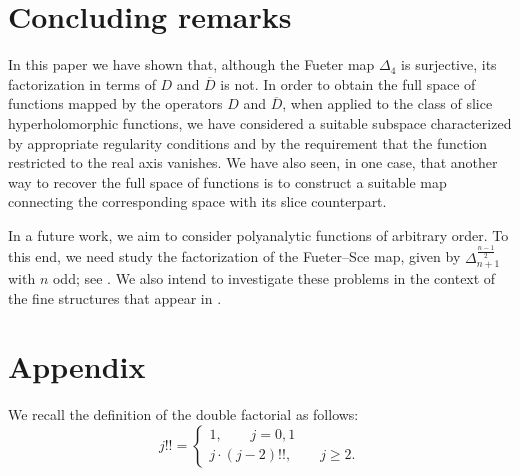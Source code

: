 \documentclass[reqno,11pt]{amsart}
\numberwithin{equation}{section}
\theoremstyle{definition}
\begin{document}
\section{Concluding remarks}

In this paper we have shown that, although the Fueter map $\Delta_4$ is surjective, its factorization in terms of $D$ and $\overline{D}$ is not. In order to obtain the full space of functions mapped by the operators $D$ and $\overline{D}$, when applied to the class of slice hyperholomorphic functions, we have considered a suitable subspace characterized by appropriate regularity conditions and by the requirement that the function restricted to the real axis vanishes. We have also seen, in one case, that another way to recover the full space of functions is to construct a suitable map connecting the corresponding space with its slice counterpart.

In a future work, we aim to consider polyanalytic functions of arbitrary order. To this end, we need study the factorization of the Fueter--Sce map, given by $\Delta_{n+1}^{\frac{n-1}{2}}$ with $n$ odd; see \cite{CDP25, Fivedim}. We also intend to investigate these problems in the context of the fine structures that appear in \cite{CDP2026}.










\section*{Appendix}


We recall the definition of the double factorial as follows:
$$ j!! =\begin{cases}
	1, \qquad j=0,1\\
	j \cdot (j-2)!!, \qquad j \geq 2.
\end{cases}
$$
\end{document}
